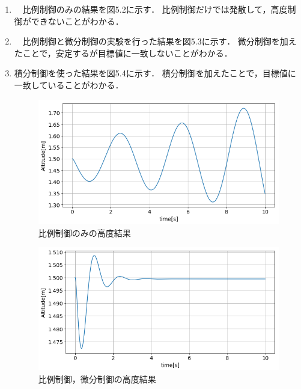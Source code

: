 \begin{enumerate}
  \item　比例制御のみの結果を図5.2に示す．
比例制御だけでは発散して，高度制御ができないことがわかる．


  \item　比例制御と微分制御の実験を行った結果を図5.3に示す．
微分制御を加えたことで，安定するが目標値に一致しないことがわかる．


  \item 積分制御を使った結果を図5.4に示す．
積分制御を加えたことで，目標値に一致していることがわかる．

\begin{figure}[htbp]
  \begin{center}
   \includegraphics[width=150mm]{img/発散.jpg}
    \end{center}
  \caption{比例制御のみの高度結果}
 \label{fig:ensyu3tex}
\end{figure}

\begin{figure}[htbp]
  \begin{center}
   \includegraphics[width=150mm]{img/PD.jpg}
    \end{center}
  \caption{比例制御，微分制御の高度結果}
 \label{fig:ensyu3tex}
\end{figure}


\end{enumerate}
